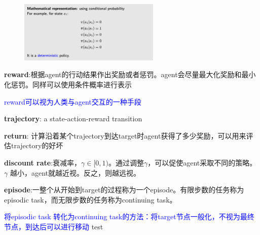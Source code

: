 \documentclass{article}
\begin{document}
\begin{figure}[htbp]
    \center{}
    \includegraphics[width=0.6\textwidth]{picture3.png}
    \center{}
\end{figure}

\textbf{reward}:根据agent的行动结果作出奖励或者惩罚。agent会尽量最大化奖励和最小化惩罚。同样可以使用条件概率进行表示

\textcolor{blue}{\kaishu*reward可以视为人类与agent交互的一种手段}

\textbf{trajectory}: a state-action-reward transition

\textbf{return}: 计算沿着某个trajectory到达target时agent获得了多少奖励，可以用来评估trajectory的好坏

\textbf{discount rate}:衰减率，$\gamma \in [0, 1)$。通过调整$\gamma$，可以促使agent采取不同的策略。$\gamma$ 越小，agent就越近视。反之，则越远视。

\textbf{episode}:一整个从开始到target的过程称为一个episode。有限步数的任务称为episodic task，而无限步数的任务称为continuing task。

\textcolor{blue}{\kaishu*将episodic task 转化为continuing task的方法：将target节点一般化，不视为最终节点，到达后可以进行移动}
test
\end{document}
